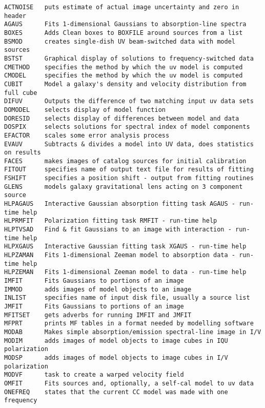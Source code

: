 \vfill\eject
{}

\vskip 0.5pt
\bbve\begin{verbatim}
ACTNOISE   puts estimate of actual image uncertainty and zero in header
AGAUS      Fits 1-dimensional Gaussians to absorption-line spectra
BOXES      Adds Clean boxes to BOXFILE around sources from a list
BSMOD      creates single-dish UV beam-switched data with model sources
BSTST      Graphical display of solutions to frequency-switched data
CMETHOD    specifies the method by which the uv model is computed
CMODEL     specifies the method by which the uv model is computed
CUBIT      Model a galaxy's density and velocity distribution from full cube
DIFUV      Outputs the difference of two matching input uv data sets
DOMODEL    selects display of model function
DORESID    selects display of differences between model and data
DOSPIX     selects solutions for spectral index of model components
EFACTOR    scales some error analysis process
EVAUV      Subtracts & divides a model into UV data, does statistics on results
FACES      makes images of catalog sources for initial calibration
FITOUT     specifies name of output text file for results of fitting
FSHIFT     specifies a position shift - output from fitting routines
GLENS      models galaxy gravitational lens acting on 3 component source
HLPAGAUS   Interactive Gaussian absorption fitting task AGAUS - run-time help
HLPRMFIT   Polarization fitting task RMFIT - run-time help
HLPTVSAD   Find & fit Gaussians to an image with interaction - run-time help
HLPXGAUS   Interactive Gaussian fitting task XGAUS - run-time help
HLPZAMAN   Fits 1-dimensional Zeeman model to absorption data - run-time help
HLPZEMAN   Fits 1-dimensional Zeeman model to data - run-time help
IMFIT      Fits Gaussians to portions of an image
IMMOD      adds images of model objects to an image
INLIST     specifies name of input disk file, usually a source list
JMFIT      Fits Gaussians to portions of an image
MFITSET    gets adverbs for running IMFIT and JMFIT
MFPRT      prints MF tables in a format needed by modelling software
MODAB      Makes simple absorption/emission spectral-line image in I/V
MODIM      adds images of model objects to image cubes in IQU polarization
MODSP      adds images of model objects to image cubes in I/V polarization
MODVF      task to create a warped velocity field
OMFIT      Fits sources and, optionally, a self-cal model to uv data
ONEFREQ    states that the current CC model was made with one frequency

\end{verbatim}

